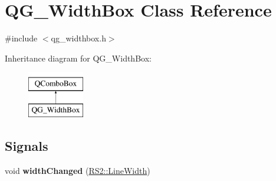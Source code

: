 \hypertarget{classQG__WidthBox}{\section{Q\-G\-\_\-\-Width\-Box Class Reference}
\label{classQG__WidthBox}
}


{\ttfamily \#include $<$qg\-\_\-widthbox.\-h$>$}

Inheritance diagram for Q\-G\-\_\-\-Width\-Box\-:\begin{figure}[H]
\begin{center}
\leavevmode
\includegraphics[height=2.000000cm]{classQG__WidthBox}
\end{center}
\end{figure}
\subsection*{Signals}
\begin{DoxyCompactItemize}
\item 
\hypertarget{classQG__WidthBox_abe2b59e3fcd7cfa4e2a5304b406c1604}{void {\bfseries width\-Changed} (\hyperlink{classRS2_a023485c482c5ee9e36b3dfad781adf29}{R\-S2\-::\-Line\-Width})}\label{classQG__WidthBox_abe2b59e3fcd7cfa4e2a5304b406c1604}

\end{DoxyCompactItemize}

